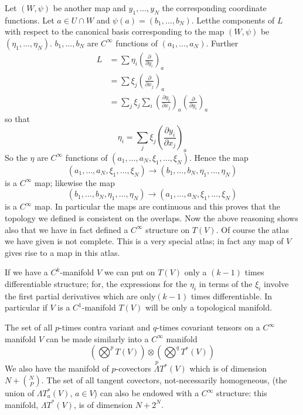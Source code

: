 Let $(W,\psi)$ be another map and $y_{1},\ldots,y_{N}$ the
corresponding coordinate functions. Let $a\in U\cap W$ and
$\psi(a)=(b_{1},\ldots,b_{N})$. Let\pageoriginale the components of
$L$ with respect to the canonical basis corresponding to the map
$(W,\psi)$ be $(\eta_{1},\ldots,\eta_{N})$. $b_{1},\ldots,b_{N}$ are
$C^{\infty}$ functions of $(a_{1},\ldots,a_{N})$. Further
\begin{align*}
L &= \sum\eta_{i}(\frac{\partial}{\partial y_{i}})_a\\
 &= \sum\xi_{j}\left(\frac{\partial}{\partial x_{j}}\right)_{a}\\
&= \sum_{j}\xi_{j}\sum_{i}\left(\frac{\partial y_{i}}{\partial
  x_{j}}\right)_{a}\left(\frac{\partial}{\partial y_{i}}\right)_{a} 
\end{align*}
so that
$$
\eta_{i}=\sum_{j}\xi_{j}\left(\frac{\partial y_{i}}{\partial x_{j}}\right)_{a}
$$
So the $\eta$ are $C^{\infty}$ functions of
$(a_{1},\ldots,a_{N},\xi_{1},\ldots,\xi_{N})$. Hence the map
$$
(a_{1},\ldots,a_{N},\xi_{1},\ldots,\xi_{N})\to
(b_{1},\ldots,b_{N},\eta_{1},\ldots,\eta_{N}) 
$$
is a $C^{\infty}$ map; likewise the map
$$
(b_{1},\ldots,b_{N},\eta_{1},\ldots,\eta_{N})\to
(a_{1},\ldots,a_{N},\xi_{1},\ldots,\xi_{N}) 
$$
is a $C^{\infty}$ map. In particular the maps are continuous and this
proves that the topology we defined is consistent on the
overlaps. Now the above reasoning shows also that we have in fact
defined a $C^{\infty}$ structure on $T(V)$. Of course the atlas we
have given is not complete. This is a very special atlas; in fact any
map of $V$ gives rise to a map in this atlas.

If we have a $C^{k}$-manifold $V$ we can put on $T(V)$ only a $(k-1)$
times differentiable structure; for, the expressions for the
$\eta_{i}$ in terms of the $\xi_{i}$ involve the first partial
derivatives which are only\pageoriginale $(k-1)$ times
differentiable. In particular if $V$ is a $C^1$-manifold $T(V)$ will be
only a topological manifold.

The set of all $p$-times contra variant and $q$-times covariant
tensors on a $C^{\infty}$ manifold $V$ can be made similarly into a
$C^{\infty}$ manifold
$$
\left(\bigotimes^{p}T(V)\right)\otimes
\left(\bigotimes^{q}T^{\ast}(V)\right)
$$
We also have the manifold of $p$-covectors
$\overset{p}{\Lambda}T^{\ast}(V)$ which is of dimension
$N+\binom{N}{P}$. The set of all tangent covectors, not-necessarily
homogeneous, (\iec the union of $\Lambda T^{\ast}_{a}(V)$, $a\in V$)
can also be endowed with a $C^{\infty}$ structure: this manifold,
$\Lambda T^{\ast}(V)$, is of dimension $N+2^{N}$.

